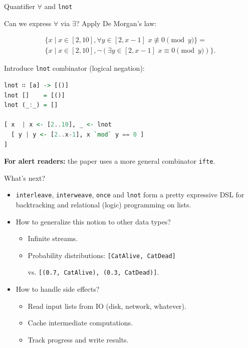 \documentclass[handout]{beamer}
\begin{document}
\begin{frame}[fragile]{Quantifier $\forall$ and {\tt lnot}}

Can we express $\forall$ via $\exists$? Apply De Morgan's law:

\begin{multline*}
\bigl\{ x \mid x \in [2, 10], \forall y \in [2, x-1] \,\, x \not\equiv 0 \!\!\! \pmod y \bigr\} = \\
\bigl\{ x \mid x \in [2, 10], \neg (\exists y \in [2, x-1] \,\, x \equiv 0 \!\!\! \pmod y) \bigr\}.
\end{multline*}

\pause

Introduce {\tt lnot} combinator (logical negation):

\begin{lstlisting}[language=Haskell]
lnot ∷ [a] -> [()]
lnot []    = [()]
lnot (_:_) = []

[ x  | x <- [2..10], _ <- lnot
  [ y | y <- [2..x-1], x `mod` y == 0 ]
]
\end{lstlisting}

{\bf For alert readers:} the paper uses a more general combinator {\tt ifte}.

\end{frame}

\begin{frame}{What's next?}

\begin{itemize}[<+->]
\item {\tt interleave}, {\tt interweave}, {\tt once} and {\tt lnot}
      form a pretty expressive DSL for backtracking and relational (logic) programming
      on lists.
\item How to generalize this notion to other data types?
\begin{itemize}
  \item Infinite streams.
  \item Probability distributions:
        {\tt [CatAlive, CatDead]} \par vs.
        {\tt [(0.7, CatAlive), (0.3, CatDead)]}.
\end{itemize}
\item How to handle side effects?
\begin{itemize}
  \item Read input lists from IO (disk, network, whatever).
  \item Cache intermediate computations.
  \item Track progress and write results.
\end{itemize}
\end{itemize}

\end{frame}
\end{document}

